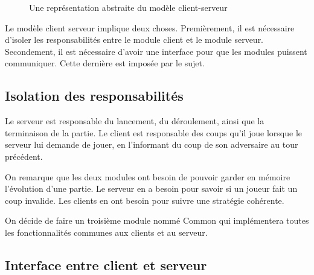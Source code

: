 \begin{figure}[H]
	\centering
	\caption{Une représentation abstraite du modèle client-serveur}
	\label{fig:repr-serveur}
\end{figure}

Le modèle client serveur implique deux choses.
Premièrement, il est nécessaire d'isoler les responsabilités entre le module client et le module serveur.
Secondement, il est nécessaire d'avoir une interface pour que les modules puissent communiquer.
Cette dernière est imposée par le sujet.

\subsection{Isolation des responsabilités}

Le serveur est responsable du lancement, du déroulement, ainsi que la terminaison de la partie.
Le client est responsable des coups qu'il joue lorsque le serveur lui demande de jouer, 
en l'informant du coup de son adversaire au tour précédent.

On remarque que les deux modules ont besoin de pouvoir garder en mémoire l'évolution d'une partie.
Le serveur en a besoin pour savoir si un joueur fait un coup invalide.
Les clients en ont besoin pour suivre une stratégie cohérente.

On décide de faire un troisième module nommé Common qui implémentera toutes les fonctionnalités communes 
aux clients et au serveur.

\subsection{Interface entre client et serveur}

